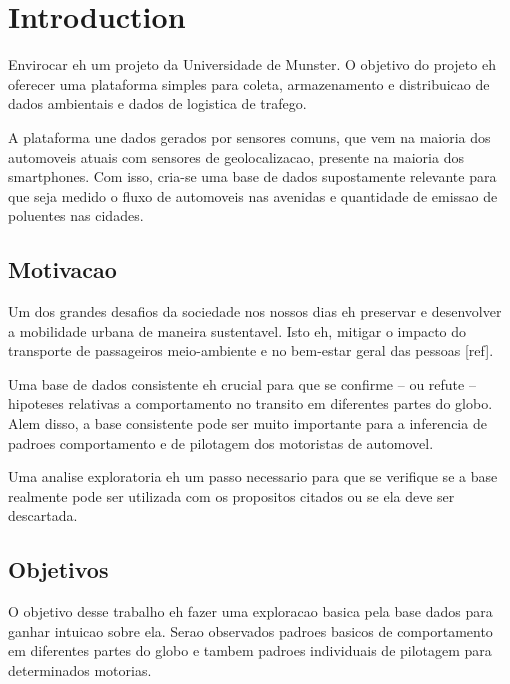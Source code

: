\documentclass[10pt, conference]{IEEEtran}
\begin{document}
\IEEEpeerreviewmaketitle





\section{Introduction}
Envirocar eh um projeto da Universidade de Munster. O objetivo 
do projeto eh oferecer uma plataforma simples para coleta, 
armazenamento e distribuicao de dados ambientais e dados de logistica
de trafego. 

A plataforma une dados gerados por sensores comuns,
que vem na maioria dos automoveis atuais com sensores de 
geolocalizacao, presente na maioria dos smartphones. Com isso,
cria-se uma base de dados supostamente relevante para que seja medido o fluxo de automoveis
nas avenidas e quantidade de emissao de poluentes nas cidades. 

\subsection{Motivacao}
%

Um dos grandes desafios da sociedade nos nossos dias eh preservar
e desenvolver a mobilidade urbana de maneira sustentavel. Isto eh,
mitigar o impacto do transporte de passageiros meio-ambiente e no
bem-estar geral das pessoas [ref].

Uma base de dados consistente eh crucial para que se confirme
-- ou refute -- hipoteses relativas a comportamento no transito
em diferentes partes do globo. Alem disso, a base consistente
pode ser muito importante para a inferencia de padroes comportamento 
e de pilotagem dos motoristas de automovel. 

Uma analise exploratoria eh um passo necessario para que se verifique
se a base realmente pode ser utilizada com os propositos citados 
ou se ela deve ser descartada.


\subsection{Objetivos}
%
O objetivo desse trabalho eh fazer uma exploracao basica pela base dados
para ganhar intuicao sobre ela.  Serao observados padroes basicos de 
comportamento em diferentes partes do globo e tambem padroes individuais
de pilotagem para determinados motorias.
\end{document}
